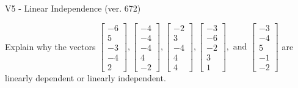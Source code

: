 \begin{exercise}
  \begin{exerciseTitle}V5 - Linear Independence (ver. 672)\end{exerciseTitle}
  \begin{exerciseStatement}
    Explain why the vectors \(\left[\begin{array}{r}
-6 \\
5 \\
-3 \\
-4 \\
2
\end{array}\right] , \left[\begin{array}{r}
-4 \\
-4 \\
-4 \\
4 \\
-2
\end{array}\right] , \left[\begin{array}{r}
-2 \\
3 \\
-4 \\
4 \\
4
\end{array}\right] , \left[\begin{array}{r}
-3 \\
-6 \\
-2 \\
3 \\
1
\end{array}\right] , \text{ and } \left[\begin{array}{r}
-3 \\
-4 \\
5 \\
-1 \\
-2
\end{array}\right]\) are linearly dependent or linearly independent.	



\end{exerciseStatement}
\end{exercise}
